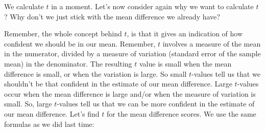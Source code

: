 \documentclass[
  letterpaper,
  DIV=11,
  numbers=noendperiod]{scrreprt}
\begin{document}
We calculate \(t\) in a moment. Let's now consider again why we want to
calculate \(t\)? Why don't we just stick with the mean difference we
already have?

Remember, the whole concept behind \(t\), is that it gives an indication
of how confident we should be in our mean. Remember, \(t\) involves a
measure of the mean in the numerator, divided by a measure of variation
(standard error of the sample mean) in the denominator. The resulting
\(t\) value is small when the mean difference is small, or when the
variation is large. So small \(t\)-values tell us that we shouldn't be
that confident in the estimate of our mean difference. Large
\(t\)-values occur when the mean difference is large and/or when the
measure of variation is small. So, large \(t\)-values tell us that we
can be more confident in the estimate of our mean difference. Let's find
\(t\) for the mean difference scores. We use the same formulas as we did
last time:
\end{document}
